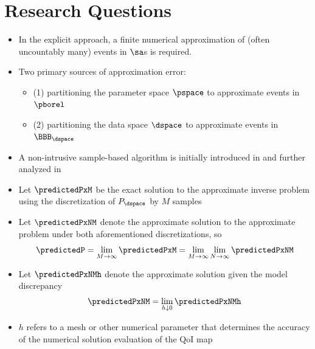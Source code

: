 
\section{Research Questions}
\begin{frame}[t]
\begin{itemize}
	\item In the explicit approach, a finite numerical approximation of (often uncountably many) events in $\sa$s is required.
	\item Two primary sources of approximation error: 
	\begin{itemize}
	
		\item (1) partitioning the parameter space $\pspace$ to approximate events in $\pborel$
		\item (2) partitioning the data space $\dspace$ to approximate events in $\BBB_{\dspace}$
	
	\end{itemize}
	\item A non-intrusive sample-based algorithm is initially introduced in \cite{BET+14} and further analyzed in \cite{BET+14-arxiv}
\end{itemize}
\end{frame}


\begin{frame}[t]
\begin{itemize}
	\item <1-> Let $\predictedPxM$ be the exact solution to the approximate inverse problem using the discretization of $P_\dspace$ by $M$ samples
	\item <2-> Let $\predictedPxNM$ denote the approximate solution to the approximate problem under both aforementioned discretizations, so 
\[
\predictedP = \lim\limits_{M\to\infty} \predictedPxM = \lim\limits_{M\to\infty} \lim\limits_{N\to\infty} \predictedPxNM
\]
	\item <3-> Let $\predictedPxNMh$ denote the approximate solution given the model discrepancy
\[
\predictedPxNM= \lim\limits_{h \downarrow 0} \predictedPxNMh
\]
\item <3-> $h$ refers to a mesh or other numerical parameter that determines the accuracy of the numerical solution evaluation of the QoI map
\end{itemize}

\end{frame}

